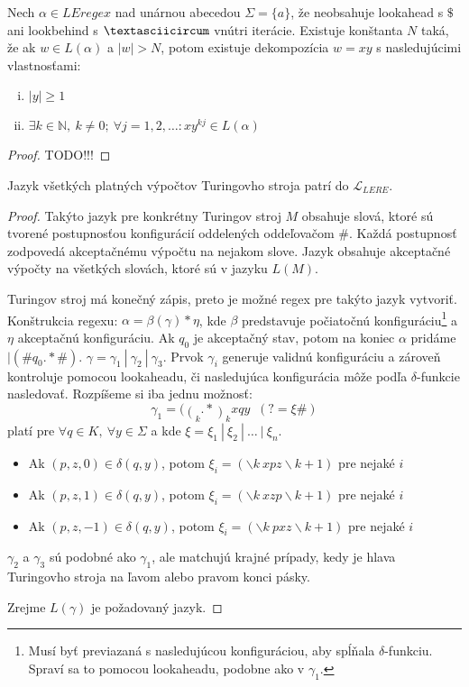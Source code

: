 \documentclass{svk_long_sk}
\def\N{\mathds{N}} %
\def\le{LEregex}
\def\lel{\mathscr{L}_{LERE}}
\def\TODO{{\color{red} TODO!!!}}
\begin{document}
\begin{theorem}
Nech $\alpha\in\le$ nad unárnou abecedou $\Sigma = \lbrace a \rbrace$, že neobsahuje lookahead s $\mathdollar$ ani lookbehind s $\textasciicircum$ vnútri iterácie. Existuje konštanta $N$ taká, že ak $w \in L(\alpha)$ a $\vert w \vert > N$, potom existuje dekompozícia $w=xy$ s nasledujúcimi vlastnosťami:
\begin{enumerate}[(i)]
\item $\vert y \vert \geq 1$
\item $\exists k \in \N,~k\neq 0;~\forall j = 1,2,\ldots: xy^{kj} \in L(\alpha)$
\end{enumerate}
\end{theorem}
\begin{proof}
\TODO
\end{proof}

\begin{theorem}
Jazyk všetkých platných výpočtov Turingovho stroja patrí do $\lel$.
\end{theorem}
\begin{proof}
Takýto jazyk pre konkrétny Turingov stroj $M$ obsahuje slová, ktoré sú tvorené postupnosťou konfigurácií oddelených oddeľovačom \#. Každá postupnosť zodpovedá akceptačnému výpočtu na nejakom slove. Jazyk obsahuje akceptačné výpočty na všetkých slovách, ktoré sú v jazyku $L(M)$.

Turingov stroj má konečný zápis, preto je možné regex pre takýto jazyk vytvoriť. Konštrukcia regexu: $\alpha = \beta(\gamma)*\eta$, kde $\beta$ predstavuje počiatočnú konfiguráciu\footnote{Musí byť previazaná s nasledujúcou konfiguráciou, aby spĺňala $\delta$-funkciu. Spraví sa to pomocou lookaheadu, podobne ako v $\gamma_1$.} a $\eta$ akceptačnú konfiguráciu. Ak $q_0$ je akceptačný stav, potom na koniec $\alpha$ pridáme $|(\#q_0.*\#)$. $\gamma = \gamma_1~|~\gamma_2~|~\gamma_3$.	Prvok $\gamma_i$ generuje validnú konfiguráciu a zároveň kontroluje pomocou lookaheadu, či nasledujúca konfigurácia môže podľa $\delta$-funkcie nasledovať. Rozpíšeme si iba jednu možnosť: 
 $$ \displaystyle \gamma_1=(\mathop(_k.*\mathop)_k x q y \mathop(_{k+1} .* \mathop)_{k+1} \#)(?= \xi \#)$$ platí pre $\forall q \in K,~\forall y \in \Sigma$ a kde $ \xi = \xi_1 ~|~ \xi_2 ~|~ \dots ~|~ \xi_n $.
\begin{itemize}
\item Ak $ (p,z,0) \in \delta(q,y)$, potom $\xi_i = (\backslash k~x p z \backslash k+1)$ pre nejaké $i$
\item Ak $ (p,z,1) \in \delta(q,y)$, potom $\xi_i = (\backslash k~x z p \backslash k+1)$ pre nejaké $i$
\item Ak $ (p,z,-1) \in \delta(q,y)$, potom $\xi_i = (\backslash k~p x z \backslash k+1)$ pre nejaké $i$
\end{itemize}

$\gamma_2$ a $\gamma_3$ sú podobné ako $\gamma_1$, ale matchujú krajné prípady, kedy je hlava Turingovho stroja na ľavom alebo pravom konci pásky.

Zrejme $L(\gamma)$ je požadovaný jazyk.
\end{proof}
\end{document}
